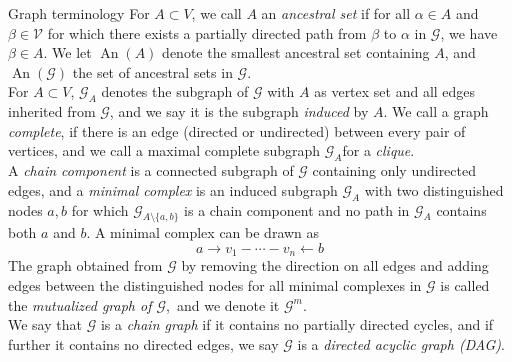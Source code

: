 \documentclass[11pt, a4paper]{memoir}
\theoremstyle{break}
\theoremstyle{break}
\theoremstyle{nonumberplain}
\DeclareMathOperator{\an}{An}
\begin{document}
\begin{mydefinition}{Graph terminology}
For $A\subset V$, we call $A$ an \emph{ancestral set} if for all $\alpha\in A$ and  $\beta \in \mathcal{V}$ for which there exists a partially directed path from $\beta$ to $\alpha$ in $\mathcal{G}$, we have $\beta \in A$. We let $\an(A)$ denote the smallest ancestral set containing $A$, and $\an(\mathcal{G})$ the set of ancestral sets in $\mathcal{G}$.\\[5pt]
For $A\subset V$, $\mathcal{G}_A$ denotes the subgraph of $\mathcal{G}$ with $A$ as vertex set and all edges inherited from $\mathcal{G}$, and we say it is the subgraph \emph{induced} by $A$.  We call a graph \emph{complete}, if there is an edge (directed or undirected) between every pair of vertices, and we call a maximal complete subgraph $\mathcal{G}_A$for a \emph{clique}.\\[5pt]
A \emph{chain component} is a connected  subgraph of $\mathcal{G}$ containing only undirected edges, and a \emph{minimal complex}  is an induced subgraph $\mathcal{G}_A$ with two distinguished nodes $a,b$ for which $\mathcal{G}_{A\setminus \{a,b\}}$ is a chain component and no path in $\mathcal{G}_A$ contains both $a$ and $b$. A minimal complex can be drawn as
$$a\to v_1-\cdots-v_n\gets b$$
The graph obtained from $\mathcal{G}$ by removing the direction on all edges and adding edges between the distinguished nodes for all minimal complexes in $\mathcal{G}$ is called the \emph{mutualized graph of $\mathcal{G}$},\footnotemark\ and we denote it $\mathcal{G}^m$.\\[5pt]
We say that $\mathcal{G}$ is a \emph{chain graph} if it contains no partially directed cycles, and if further it contains no directed edges, we say $\mathcal{G}$ is a \emph{directed acyclic graph (DAG)}.
\end{mydefinition}
\end{document}
